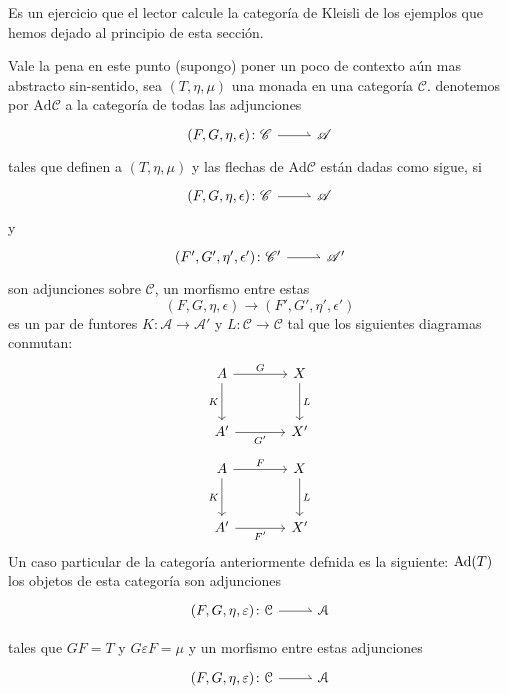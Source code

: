 \documentclass{comunicaciones}
\begin{document}
Es un ejercicio que el lector calcule la categoría de Kleisli de los ejemplos que hemos dejado al principio de esta sección.

Vale la pena en este punto (supongo) poner un poco de contexto aún mas abstracto sin-sentido, sea $(T,\eta,\mu)$ una monada en una categoría $\mathscr{C}$.
denotemos por $\mathrm{Ad}\mathcal{C}$ a la categoría de todas las adjunciones
\[\begin{tikzcd}
	{(F,G,\eta,\epsilon)\colon\mathscr{C}} & {\mathscr{A}}
	\arrow[harpoon, from=1-1, to=1-2]
\end{tikzcd}\]
tales que definen a $(T,\eta,\mu)$ y las flechas de $\mathrm{Ad}\mathscr{C}$ están dadas como sigue, si 
\[\begin{tikzcd}
	{(F,G,\eta,\epsilon)\colon\mathscr{C}} & {\mathscr{A}}
	\arrow[harpoon, from=1-1, to=1-2]
\end{tikzcd}\]
y
\[\begin{tikzcd}
	{(F',G',\eta',\epsilon')\colon\mathscr{C}'} & {\mathscr{A}'}
	\arrow[harpoon, from=1-1, to=1-2]
\end{tikzcd}\]
son adjunciones sobre $\mathscr{C}$, un morfismo entre estas \[(F,G,\eta,\epsilon)\rightarrow(F',G',\eta',\epsilon')\] 
es un par de funtores $K\colon\mathscr{A}\rightarrow\mathscr{A}'$ y $L\colon\mathscr{C}\rightarrow\mathscr{C}$ tal que
los siguientes diagramas conmutan:
\[
\begin{tikzcd}[column sep=large, row sep=large]
A \arrow[r, "G"] \arrow[d, "K"'] & X \arrow[d, "L"] \\
A' \arrow[r, "G'"'] & X'
\end{tikzcd}
\]
\[
\begin{tikzcd}[column sep=large, row sep=large]
A \arrow[r, "F"] \arrow[d, "K"'] & X \arrow[d, "L"] \\
A' \arrow[r, "F'"'] & X'
\end{tikzcd}\]
Un caso particular de la categoría anteriormente defnida es la siguiente: ${\rm Ad}(T)$ los objetos de esta categoría son adjunciones \[\begin{tikzcd}
	{(F,G,\eta,\varepsilon)\colon\mathcal{C}} & {\mathcal{A}}
	\arrow[harpoon, from=1-1, to=1-2]
\end{tikzcd}\]

tales que $GF=T$ y $G\varepsilon F=\mu$ y un morfismo entre estas adjunciones \[\begin{tikzcd}
	{(F,G,\eta,\varepsilon)\colon\mathcal{C}} & {\mathcal{A}}
	\arrow[harpoon, from=1-1, to=1-2]
\end{tikzcd}\]
\end{document}
